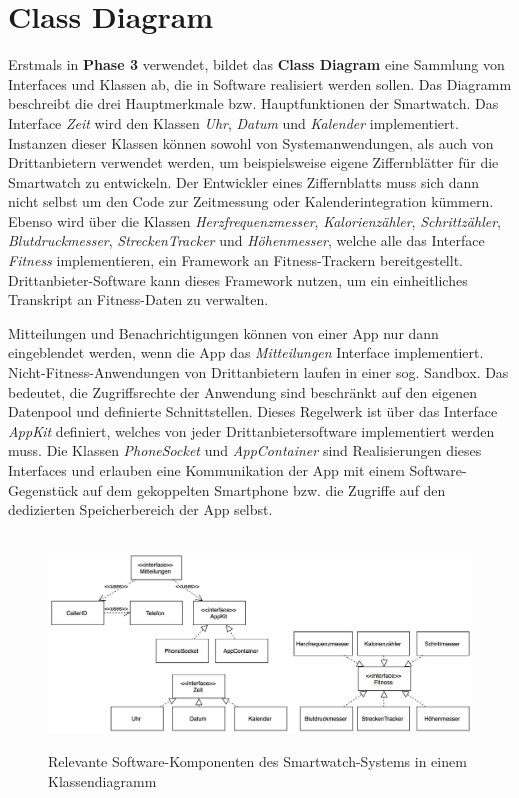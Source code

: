 \section{Class Diagram}

Erstmals in \textbf{Phase 3} verwendet, bildet das \textbf{Class Diagram} eine Sammlung von Interfaces und Klassen ab, die in Software realisiert werden sollen. Das Diagramm beschreibt die drei Hauptmerkmale bzw. Hauptfunktionen der Smartwatch. Das Interface \emph{Zeit} wird den Klassen \emph{Uhr}, \emph{Datum} und \emph{Kalender} implementiert. Instanzen dieser Klassen können sowohl von Systemanwendungen, als auch von Drittanbietern verwendet werden, um beispielsweise eigene Ziffernblätter für die Smartwatch zu entwickeln. Der Entwickler eines Ziffernblatts muss sich dann nicht selbst um den Code zur Zeitmessung oder Kalenderintegration kümmern. Ebenso wird über die Klassen \emph{Herzfrequenzmesser}, \emph{Kalorienzähler}, \emph{Schrittzähler}, \emph{Blutdruckmesser}, \emph{StreckenTracker} und \emph{Höhenmesser}, welche alle das Interface \emph{Fitness} implementieren, ein Framework an Fitness-Trackern bereitgestellt. Drittanbieter-Software kann dieses Framework nutzen, um ein einheitliches Transkript an Fitness-Daten zu verwalten.

Mitteilungen und Benachrichtigungen können von einer App nur dann eingeblendet werden, wenn die App das \emph{Mitteilungen} Interface implementiert. Nicht-Fitness-Anwendungen von Drittanbietern laufen in einer sog. \gls{Sandbox}. Das bedeutet, die Zugriffsrechte der Anwendung sind beschränkt auf den eigenen Datenpool und definierte Schnittstellen. Dieses Regelwerk ist über das Interface \emph{AppKit} definiert, welches von jeder Drittanbietersoftware implementiert werden muss. Die Klassen \emph{PhoneSocket} und \emph{AppContainer} sind Realisierungen dieses Interfaces und erlauben eine Kommunikation der App mit einem Software-Gegenstück auf dem gekoppelten Smartphone bzw. die Zugriffe auf den dedizierten Speicherbereich der App selbst.

\begin{figure}[h]
\centering\
\includegraphics[width=\textwidth]{img/classdiagram}
\caption{Relevante Software-Komponenten des Smartwatch-Systems in einem Klassendiagramm}\label{fig:class}
\end{figure}
